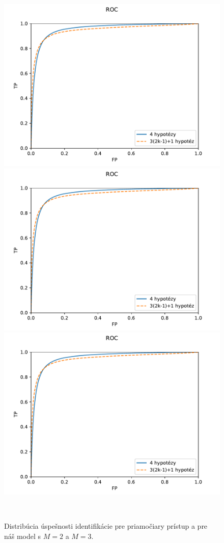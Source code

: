 \begin{figure}[!ht]
\begin{center}
\begin{minipage}{\textwidth}
     \includegraphics[width=.47\textwidth]{plots/1_ROC}\\
     \includegraphics[width=.47\textwidth]{plots/1_ROC}\quad
     \includegraphics[width=.47\textwidth]{plots/1_ROC}
   \end{minipage}\\[1em]   
   \end{center}
\caption{Distribúcia úspešnosti identifikácie pre priamočiary prístup a pre náš model s $M=2$ a $M=3$.}
\label{fig:uspesnost_final}
\end{figure}


